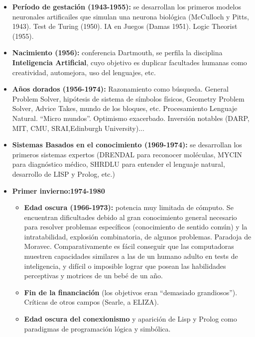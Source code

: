 \documentclass{article}
\begin{document}
\begin{itemize}
\item \textbf{Período de gestación (1943-1955):} se desarrollan los primeros modelos neuronales artificailes que simulan una neurona biológica (McCulloch y Pitts, 1943). Test de Turing (1950). IA en Juegos (Damas 1951). Logic Theorist (1955).

\item \textbf{Nacimiento (1956):} conferencia Dartmouth, se perfila la disciplina \textbf{Inteligencia Artificial}, cuyo objetivo es duplicar facultades humanas como creatividad, automejora, uso del lenguajes, etc.

\item \textbf{Años dorados (1956-1974):} Razonamiento como búsqueda. General Problem Solver, hipótesis de sistema de símbolos físicos, Geometry Problem Solver, Advice Takes, mundo de los bloques, etc. Procesamiento Lenguaje Natural. ``Micro mundos''. Optimismo exacerbado. Inversión notables (DARP, MIT, CMU, SRAI,Edinburgh University)...

\item \textbf{Sistemas Basados en el conocimiento (1969-1974):} se desarrollan los primeros sistemas expertos (DRENDAL para reconocer moléculas, MYCIN para diagnóstico médico, SHRDLU para entender el lenguaje natural, desarrollo de LISP y Prolog, etc.)

\item \textbf{Primer invierno:1974-1980}

\begin{itemize}
\item \textbf{Edad oscura (1966-1973):} potencia muy limitada de cómputo. Se encuentran dificultades debido al gran conocimiento general necesario para resolver problemas específicos (conocimiento de sentido común) y la intratabilidad, explosión combinatoria, de algunos problemas. Paradoja de Moravec. Comparativamente es fácil conseguir que las computadoras muestren capacidades similares a las de un humano adulto en tests de inteligencia, y difícil o imposible lograr que posean las habilidades perceptivas y motrices de un bebé de un año.

\item \textbf{Fin de la financiación} (los objetivos eran ``demasiado grandiosos''). Críticas de otros campos (Searle, a ELIZA).

\item \textbf{Edad oscura del conexionismo} y aparición de Lisp y Prolog como paradigmas de programación lógica y simbólica.
\end{itemize}


\end{itemize}
\end{document}
